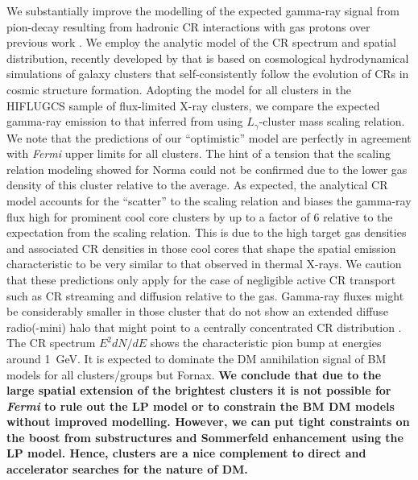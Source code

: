 \documentclass[10pt,aps,pra,reprint,amsmath,amsfonts,amssymb,showpacs,nofootinbib,floatfix]{revtex4-1}
\def\del#1{{}}
\def\C#1{{\bf #1}}
\newcommand{\Fermi}{{\em Fermi}\xspace}
\begin{document}
We substantially improve the modelling of the expected gamma-ray
signal from pion-decay resulting from hadronic CR interactions with
gas protons over previous work \citep{2010ApJ...717L..71A}. We employ
the analytic model of the CR spectrum and spatial distribution,
recently developed by \citet{2010MNRAS.409..449P} that is based on
cosmological hydrodynamical simulations of galaxy clusters that
self-consistently follow the evolution of CRs in cosmic structure
formation. Adopting the model for all clusters in the HIFLUGCS sample
of flux-limited X-ray clusters, we compare the expected gamma-ray
emission to that inferred from using $L_\gamma$-cluster mass scaling
relation. We note that the predictions of our ``optimistic'' model are
perfectly in agreement with \Fermi upper limits for all clusters.  The
hint of a tension that the scaling relation modeling showed for Norma
\citep{2010ApJ...717L..71A} could not be confirmed due to the lower
gas density of this cluster relative to the average.  As expected, the
analytical CR model accounts for the ``scatter'' to the scaling
relation and biases the gamma-ray flux high for prominent cool core
clusters by up to a factor of 6 relative to the expectation from the
scaling relation. This is due to the high target gas densities and
associated CR densities in those cool cores that shape the spatial
emission characteristic to be very similar to that observed in thermal
X-rays. We caution that these predictions only apply for the case of
negligible active CR transport such as CR streaming and diffusion
relative to the gas. Gamma-ray fluxes might be considerably smaller in
those cluster that do not show an extended diffuse radio(-mini) halo
that might point to a centrally concentrated CR distribution
\citep{2011A&A...527A..99E}. The CR spectrum $E^2 dN/dE$ shows the
characteristic pion bump at energies around 1~GeV. It is expected to
dominate the DM annihilation signal of BM models for all
clusters/groups but Fornax. \C{We conclude that due to the large
  spatial extension of the brightest clusters it is not possible for
  \Fermi to rule out the LP model or to constrain the BM DM models
  without improved modelling. However, we can put tight constraints on
  the boost from substructures and Sommerfeld enhancement using the LP
  model. Hence, clusters are a nice complement to direct and
  accelerator searches for the nature of DM.}\del{We conclude that it
  will be possible to rule out the LP model with six years of \Fermi
  data and start to constrain some BM DM models. Hence this should
  nicely complement direct and accelerator searches for the nature of
  DM.}
\end{document}
